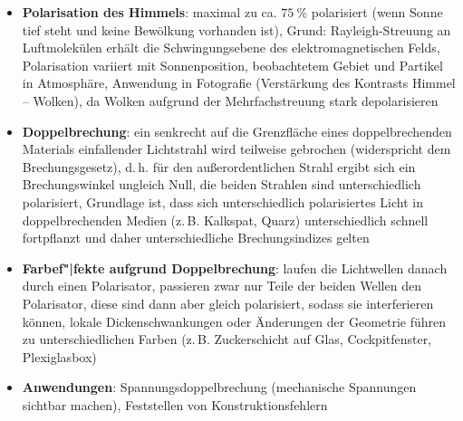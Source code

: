 \linie
\begin{itemize}
    \item
    \textbf{Polarisation des Himmels}:
    maximal zu ca. $\SI{75}{\percent}$ polarisiert
    (wenn Sonne tief steht und keine Bewölkung vorhanden ist),
    Grund: Rayleigh-Streuung an Luftmolekülen erhält die Schwingungsebene
    des elektromagnetischen Felds,
    Polarisation variiert mit Sonnenposition, beobachtetem Gebiet und
    Partikel in Atmosphäre,
    Anwendung in Fotografie (Verstärkung des Kontrasts Himmel -- Wolken),
    da Wolken aufgrund der Mehrfachstreuung stark depolarisieren
\end{itemize}
\linie
\pagebreak
\begin{itemize}
    \item
    \textbf{Doppelbrechung}:
    ein senkrecht auf die Grenzfläche eines doppelbrechenden Materials
    einfallender Lichtstrahl wird teilweise gebrochen (widerspricht dem
    Brechungsgesetz), d.\,h. für den außerordentlichen Strahl ergibt sich
    ein Brechungswinkel ungleich Null, die beiden Strahlen sind unterschiedlich
    polarisiert,
    Grundlage ist, dass sich unterschiedlich polarisiertes Licht in
    doppelbrechenden Medien (z.\,B. Kalkspat, Quarz) unterschiedlich schnell
    fortpflanzt und daher unterschiedliche Brechungsindizes gelten
    
    \item
    \textbf{Farbef"|fekte aufgrund Doppelbrechung}:
    laufen die Lichtwellen danach durch einen Polarisator, passieren zwar nur
    Teile der beiden Wellen den Polarisator, diese sind dann aber gleich
    polarisiert, sodass sie interferieren können,
    lokale Dickenschwankungen oder Änderungen der Geometrie führen zu
    unterschiedlichen Farben
    (z.\,B. Zuckerschicht auf Glas, Cockpitfenster, Plexiglasbox)
    
    \item
    \textbf{Anwendungen}:
    Spannungsdoppelbrechung (mechanische Spannungen sichtbar machen),
    Feststellen von Konstruktionsfehlern
\end{itemize}
\linie
